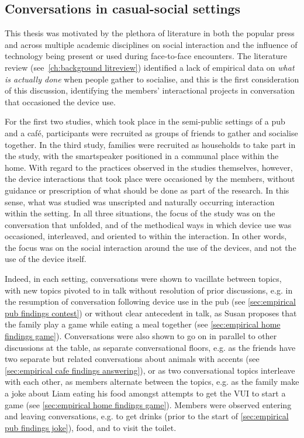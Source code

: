 \subsection{Conversations in casual-social settings}\label{sec:synopsis discussion conduct conversations}
\begin{revisedsubmission}
This thesis was motivated by the plethora of literature in both the popular press and across multiple academic disciplines on social interaction and the influence of technology being present or used during face-to-face encounters.
The literature review (see~\autoref{ch:background litreview}) identified a lack of empirical data on \textit{what is actually done} when people gather to socialise, and this is the first consideration of this discussion, identifying the members' interactional projects in conversation that occasioned the device use.

For the first two studies, which took place in the semi-public settings of a pub and a caf\'{e}, participants were recruited as groups of friends to gather and socialise together.
In the third study, families were recruited as households to take part in the study, with the smartspeaker positioned in a communal place within the home.
With regard to the practices observed in the studies themselves, however, the device interactions that took place were occasioned by the members, without guidance or prescription of what should be done as part of the research.
In this sense, what was studied was unscripted and naturally occurring interaction within the setting.
In all three situations, the focus of the study was on the conversation that unfolded, and of the methodical ways in which device use was occasioned, interleaved, and oriented to within the interaction.
In other words, the focus was on the social interaction around the use of the devices, and not the use of the device itself.

Indeed, in each setting, conversations were shown to vacillate between topics, with new topics pivoted to in talk without resolution of prior discussions, e.g. in the resumption of conversation following device use in the pub (see \ref{sec:empirical pub findings contest}) or without clear antecedent in talk, as Susan proposes that the family play a game while eating a meal together (see \ref{sec:empirical home findings game}).
Conversations were also shown to go on in parallel to other discussions at the table, as separate conversational floors, e.g. as the friends have two separate but related conversations about animals with accents (see \ref{sec:empirical cafe findings answering}), or as two conversational topics interleave with each other, as members alternate between the topics, e.g. as the family make a joke about Liam eating his food amongst attempts to get the \ac{VUI} to start a game (see \ref{sec:empirical home findings game}).
Members were observed entering and leaving conversations, e.g. to get drinks (prior to the start of \ref{sec:empirical pub findings joke}), food, and to visit the toilet.


\end{revisedsubmission}
